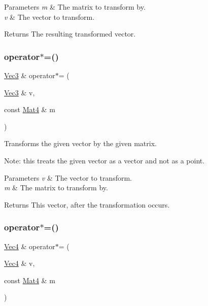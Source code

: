 \begin{DoxyParams}{Parameters}
{\em m} & The matrix to transform by. \\
\hline
{\em v} & The vector to transform. \\
\hline
\end{DoxyParams}
\begin{DoxyReturn}{Returns}
The resulting transformed vector. 
\end{DoxyReturn}
\mbox{\label{group__base_gafcbb3387bff0b483453385d23c18b40e}} 
\subsubsection{\texorpdfstring{operator$\ast$=()}{operator*=()}\hspace{0.1cm}{\footnotesize\ttfamily [1/2]}}
{\footnotesize\ttfamily \hyperlink{classVec3}{Vec3} \& operator$\ast$= (\begin{DoxyParamCaption}\item[{\hyperlink{classVec3}{Vec3} \&}]{v,  }\item[{const \hyperlink{classMat4}{Mat4} \&}]{m }\end{DoxyParamCaption})\hspace{0.3cm}{\ttfamily [inline]}}

Transforms the given vector by the given matrix.

Note\+: this treats the given vector as a vector and not as a point.


\begin{DoxyParams}{Parameters}
{\em v} & The vector to transform. \\
\hline
{\em m} & The matrix to transform by. \\
\hline
\end{DoxyParams}
\begin{DoxyReturn}{Returns}
This vector, after the transformation occurs. 
\end{DoxyReturn}
\mbox{\label{group__base_ga65ab59c724ac0a036681f5261d54d0bf}} 
\subsubsection{\texorpdfstring{operator$\ast$=()}{operator*=()}\hspace{0.1cm}{\footnotesize\ttfamily [2/2]}}
{\footnotesize\ttfamily \hyperlink{classVec4}{Vec4} \& operator$\ast$= (\begin{DoxyParamCaption}\item[{\hyperlink{classVec4}{Vec4} \&}]{v,  }\item[{const \hyperlink{classMat4}{Mat4} \&}]{m }\end{DoxyParamCaption})\hspace{0.3cm}{\ttfamily [inline]}}


